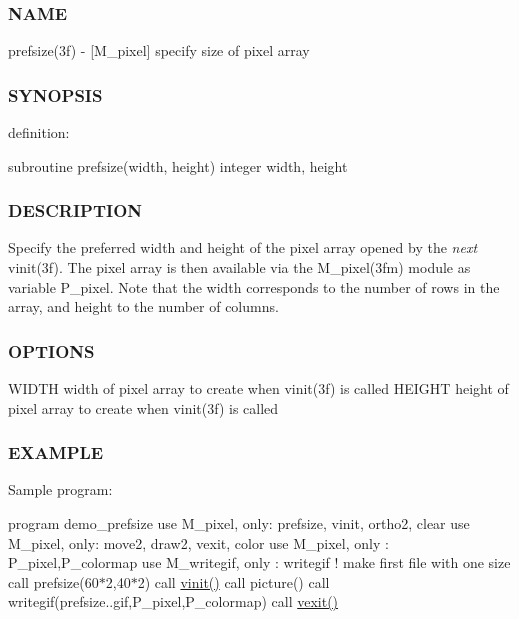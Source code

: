 \subsubsection*{N\+A\+ME}

prefsize(3f) -\/ \mbox{[}M\+\_\+pixel\mbox{]} specify size of pixel array \subsubsection*{S\+Y\+N\+O\+P\+S\+IS}

definition\+:

subroutine prefsize(width, height) integer width, height

\subsubsection*{D\+E\+S\+C\+R\+I\+P\+T\+I\+ON}

Specify the preferred width and height of the pixel array opened by the {\itshape next} vinit(3f). The pixel array is then available via the M\+\_\+pixel(3fm) module as variable P\+\_\+pixel. Note that the width corresponds to the number of rows in the array, and height to the number of columns.

\subsubsection*{O\+P\+T\+I\+O\+NS}

W\+I\+D\+TH width of pixel array to create when vinit(3f) is called H\+E\+I\+G\+HT height of pixel array to create when vinit(3f) is called

\subsubsection*{E\+X\+A\+M\+P\+LE}

Sample program\+:

program demo\+\_\+prefsize use M\+\_\+pixel, only\+: prefsize, vinit, ortho2, clear use M\+\_\+pixel, only\+: move2, draw2, vexit, color use M\+\_\+pixel, only \+: P\+\_\+pixel,P\+\_\+colormap use M\+\_\+writegif, only \+: writegif ! make first file with one size call prefsize(60$\ast$2,40$\ast$2) call \hyperlink{namespacem__pixel_ac03ca8f23fdadb60599b6ea4dc87a6d9}{vinit()} call picture() call writegif(\textquotesingle{}prefsize..\+gif\textquotesingle{},P\+\_\+pixel,P\+\_\+colormap) call \hyperlink{namespacem__pixel_a19ad6b65752322b0029a62cc0ebec3e8}{vexit()}


